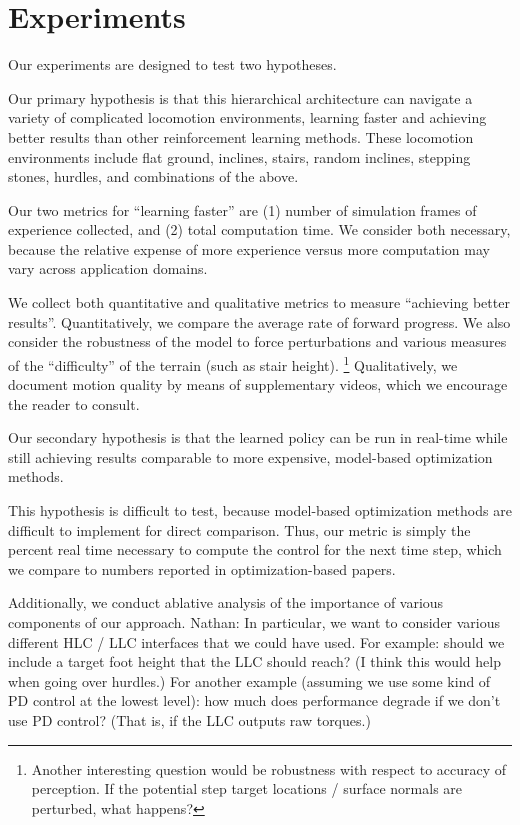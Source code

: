 \documentclass[a4paper]{article}
\newcommand{\nhatch}[1]{{\leavevmode\color{blue} Nathan: #1}}
\begin{document}
\section{Experiments}

Our experiments are designed to test two hypotheses.

Our primary hypothesis is that this hierarchical architecture can navigate a variety of complicated locomotion environments, learning faster and achieving better results than other reinforcement learning methods.
These locomotion environments include flat ground, inclines, stairs, random inclines, stepping stones, hurdles, and combinations of the above.

Our two metrics for ``learning faster'' are (1) number of simulation frames of experience collected, and (2) total computation time.
We consider both necessary, because the relative expense of more experience versus more computation may vary across application domains.

We collect both quantitative and qualitative metrics to measure ``achieving better results''.
Quantitatively, we compare the average rate of forward progress.
We also consider the robustness of the model to force perturbations and various measures of the ``difficulty'' of the terrain (such as stair height).
\footnote{Another interesting question would be robustness with respect to accuracy of perception.
If the potential step target locations / surface normals are perturbed, what happens?}
Qualitatively, we document motion quality by means of supplementary videos, which we encourage the reader to consult.

Our secondary hypothesis is that the learned policy can be run in real-time while still achieving results comparable to more expensive, model-based optimization methods.

This hypothesis is difficult to test, because model-based optimization methods are difficult to implement for direct comparison.
Thus, our metric is simply the percent real time necessary to compute the control for the next time step, which we compare to numbers reported in optimization-based papers.

Additionally, we conduct ablative analysis of the importance of various components of our approach.
\nhatch{In particular, we want to consider various different HLC / LLC interfaces that we could have used.
For example: should we include a target foot height that the LLC should reach?
(I think this would help when going over hurdles.)
For another example (assuming we use some kind of PD control at the lowest level): how much does performance degrade if we don't use PD control?
(That is, if the LLC outputs raw torques.)}
\end{document}
